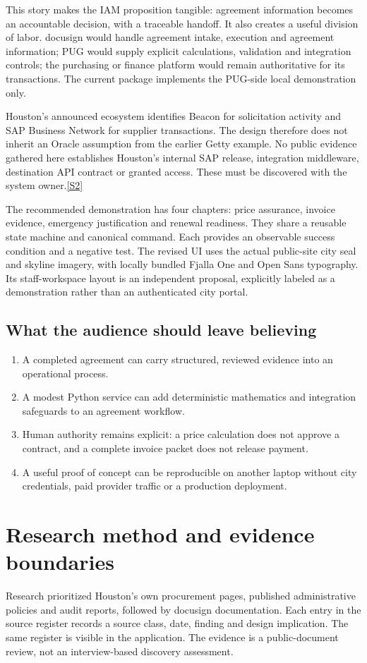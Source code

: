 \documentclass[11pt,letterpaper]{article}
\newcommand{\src}[1]{\hyperref[src:#1]{[#1]}}
\begin{document}
This story makes the IAM proposition tangible: agreement information becomes an accountable decision, with a traceable handoff. It also creates a useful division of labor. docusign would handle agreement intake, execution and agreement information; PUG would supply explicit calculations, validation and integration controls; the purchasing or finance platform would remain authoritative for its transactions. The current package implements the PUG-side local demonstration only.

Houston's announced ecosystem identifies Beacon for solicitation activity and SAP Business Network for supplier transactions. The design therefore does not inherit an Oracle assumption from the earlier Getty example. No public evidence gathered here establishes Houston's internal SAP release, integration middleware, destination API contract or granted access. These must be discovered with the system owner.\src{S2}

The recommended demonstration has four chapters: price assurance, invoice evidence, emergency justification and renewal readiness. They share a reusable state machine and canonical command. Each provides an observable success condition and a negative test. The revised UI uses the actual public-site city seal and skyline imagery, with locally bundled Fjalla One and Open Sans typography. Its staff-workspace layout is an independent proposal, explicitly labeled as a demonstration rather than an authenticated city portal.

\subsection{What the audience should leave believing}
\begin{enumerate}
\item A completed agreement can carry structured, reviewed evidence into an operational process.
\item A modest Python service can add deterministic mathematics and integration safeguards to an agreement workflow.
\item Human authority remains explicit: a price calculation does not approve a contract, and a complete invoice packet does not release payment.
\item A useful proof of concept can be reproducible on another laptop without city credentials, paid provider traffic or a production deployment.
\end{enumerate}

\section{Research method and evidence boundaries}
Research prioritized Houston's own procurement pages, published administrative policies and audit reports, followed by docusign documentation. Each entry in the source register records a source class, date, finding and design implication. The same register is visible in the application. The evidence is a public-document review, not an interview-based discovery assessment.
\end{document}
